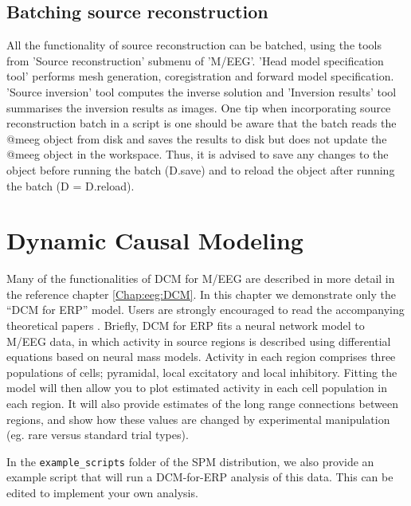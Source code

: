 \subsection{Batching source reconstruction}
All the functionality of source reconstruction can be batched, using the tools from 'Source reconstruction' submenu of 'M/EEG'. 'Head model specification tool' performs mesh generation, coregistration and forward model specification. 'Source inversion' tool computes the inverse solution and 'Inversion results' tool summarises the inversion results as images. One tip when incorporating source reconstruction batch in a script is one should be aware that the batch reads the @meeg object from disk and saves the results to disk but does not update the @meeg object in the workspace. Thus, it is advised to save any changes to the object before running the batch (D.save) and to reload the object after running the batch (D = D.reload).

\section{Dynamic Causal Modeling}

Many of the functionalities of DCM for M/EEG are described in more detail in the reference chapter \ref{Chap:eeg:DCM}. In this chapter we demonstrate only the ``DCM for ERP'' model.
Users are strongly encouraged to read the accompanying theoretical papers \cite{od_dcm_erp,sjk_dcm_erp}. Briefly, DCM for ERP fits a  neural network model to M/EEG data, in which activity in source regions is described using differential equations based on neural mass models. Activity in each region comprises three populations of cells; pyramidal, local excitatory and local inhibitory. Fitting the model will then allow you to plot estimated activity in each cell population in each region. It will also provide estimates of the long range connections between regions, and show how these values are changed by experimental manipulation (eg. rare versus standard trial types).

In the \texttt{example\_scripts} folder of the SPM distribution, we also provide an example script that will run a DCM-for-ERP analysis of this data. This can be edited to implement your own analysis.

